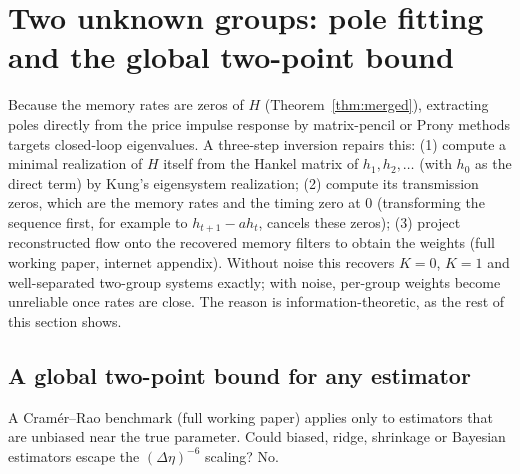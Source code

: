 \documentclass[12pt]{article}
\theoremstyle{definition}
\theoremstyle{remark}
\begin{document}
\section{Two unknown groups: pole fitting and the global two-point bound}\label{app:twocohort}

Because the memory rates are zeros of $H$ (Theorem~\ref{thm:merged}), extracting poles directly from the price impulse response by matrix-pencil or Prony methods targets closed-loop eigenvalues. A three-step inversion repairs this: (1) compute a minimal realization of $H$ itself from the Hankel matrix of $h_1,h_2,\ldots$ (with $h_0$ as the direct term) by Kung's eigensystem realization; (2) compute its transmission zeros, which are the memory rates and the timing zero at $0$ (transforming the sequence first, for example to $h_{t+1}-ah_t$, cancels these zeros); (3) project reconstructed flow onto the recovered memory filters to obtain the weights (full working paper, internet appendix). Without noise this recovers $K=0$, $K=1$ and well-separated two-group systems exactly; with noise, per-group weights become unreliable once rates are close. The reason is information-theoretic, as the rest of this section shows.

\subsection{A global two-point bound for any estimator}

A Cram\'er--Rao benchmark (full working paper) applies only to estimators that are unbiased near the true parameter. Could biased, ridge, shrinkage or Bayesian estimators escape the $(\Delta\eta)^{-6}$ scaling? No.
\end{document}
